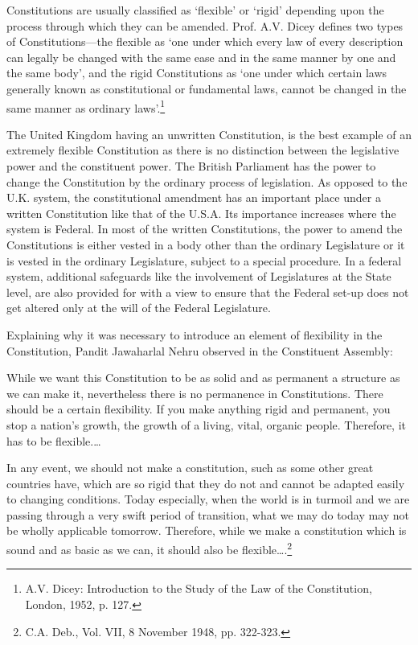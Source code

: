 \begin{multicols}{2}

\noi
Constitutions are usually classified as ‘flexible’ or ‘rigid’ depending upon the process through
which they can be amended. Prof. A.V. Dicey defines two types of Constitutions—the flexible
as ‘one under which every law of every description can legally be changed with the same ease
and in the same manner by one and the same body’, and the rigid Constitutions as ‘one under
which certain laws generally known as constitutional or fundamental laws, cannot be changed
in the same manner as ordinary laws’.\footnote{A.V. Dicey: Introduction to the Study of the Law of the Constitution, London, 1952, p. 127.}

\noi
The United Kingdom having an unwritten Constitution, is the best example of an extremely
flexible Constitution as there is no distinction between the legislative power and the
constituent power. The British Parliament has the power to change the Constitution by the
ordinary process of legislation. As opposed to the U.K. system, the constitutional amendment
has an important place under a written Constitution like that of the U.S.A. Its importance
increases where the system is Federal. In most of the written Constitutions, the power to
amend the Constitutions is either vested in a body other than the ordinary Legislature or it is
vested in the ordinary Legislature, subject to a special procedure. In a federal system,
additional safeguards like the involvement of Legislatures at the State level, are also provided
for with a view to ensure that the Federal set-up does not get altered only at the will of the
Federal Legislature.


\noi
Explaining why it was necessary to introduce an element of flexibility in the Constitution,
Pandit Jawaharlal Nehru observed in the Constituent Assembly:

\noi
While we want this Constitution to be as solid and as permanent a structure as we can make
it, nevertheless there is no permanence in Constitutions. There should be a certain flexibility.
If you make anything rigid and permanent, you stop a nation’s growth, the growth of a living,
vital, organic people. Therefore, it has to be flexible.…

\noi
In any event, we should not make a constitution, such as some other great countries have,
which are so rigid that they do not and cannot be adapted easily to changing conditions. Today
especially, when the world is in turmoil and we are passing through a very swift period of
transition, what we may do today may not be wholly applicable tomorrow. Therefore, while
we make a constitution which is sound and as basic as we can, it should also be flexible….\footnote{C.A. Deb., Vol. VII, 8 November 1948, pp. 322-323.}


\end{multicols}
